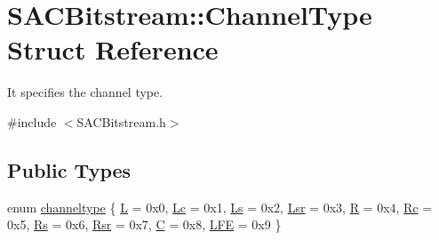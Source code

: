 \hypertarget{struct_s_a_c_bitstream_1_1_channel_type}{}\section{S\+A\+C\+Bitstream\+:\+:Channel\+Type Struct Reference}
\label{struct_s_a_c_bitstream_1_1_channel_type}


It specifies the channel type.  




{\ttfamily \#include $<$S\+A\+C\+Bitstream.\+h$>$}

\subsection*{Public Types}
\begin{DoxyCompactItemize}
\item 
enum \hyperlink{struct_s_a_c_bitstream_1_1_channel_type_a31c32b34085c06a1c58d920ca28c17c9}{channeltype} \{ \newline
\hyperlink{struct_s_a_c_bitstream_1_1_channel_type_a31c32b34085c06a1c58d920ca28c17c9a13eb8514591dc8f914e828a2b5ef721a}{L} = 0x0, 
\hyperlink{struct_s_a_c_bitstream_1_1_channel_type_a31c32b34085c06a1c58d920ca28c17c9ad134acdd72d975dd185adc12af56fbdd}{Lc} = 0x1, 
\hyperlink{struct_s_a_c_bitstream_1_1_channel_type_a31c32b34085c06a1c58d920ca28c17c9abfabd18311453175371708dbc80ae9fa}{Ls} = 0x2, 
\hyperlink{struct_s_a_c_bitstream_1_1_channel_type_a31c32b34085c06a1c58d920ca28c17c9a723885ae87caa2993f734cda066c93c8}{Lsr} = 0x3, 
\newline
\hyperlink{struct_s_a_c_bitstream_1_1_channel_type_a31c32b34085c06a1c58d920ca28c17c9a464953c6afaf1a65f4e7fbeba29c6049}{R} = 0x4, 
\hyperlink{struct_s_a_c_bitstream_1_1_channel_type_a31c32b34085c06a1c58d920ca28c17c9abb6f27e48c485d4c40f2fb4035c033ca}{Rc} = 0x5, 
\hyperlink{struct_s_a_c_bitstream_1_1_channel_type_a31c32b34085c06a1c58d920ca28c17c9a58602376d8c460fe2b26af6b4eb7c837}{Rs} = 0x6, 
\hyperlink{struct_s_a_c_bitstream_1_1_channel_type_a31c32b34085c06a1c58d920ca28c17c9a3fa09df79b849c2f632473b2380ad07e}{Rsr} = 0x7, 
\newline
\hyperlink{struct_s_a_c_bitstream_1_1_channel_type_a31c32b34085c06a1c58d920ca28c17c9a5c9b81e6c191dc59f0f4680421cafa72}{C} = 0x8, 
\hyperlink{struct_s_a_c_bitstream_1_1_channel_type_a31c32b34085c06a1c58d920ca28c17c9a9ea1b895ad06ec34500fa5ce86f261d4}{L\+FE} = 0x9
 \}
\end{DoxyCompactItemize}


